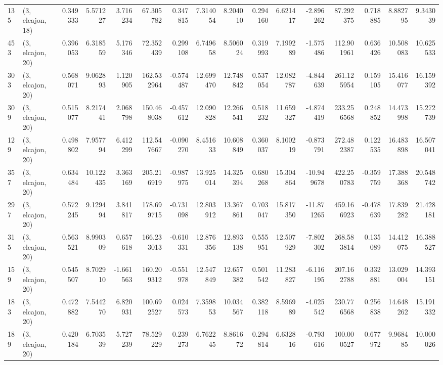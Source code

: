 \begin{tabular}{llrrrrrrrrrrrrrr}
135 &  (3, elcajon, 18) &   0.349333 &   5.571227 &   3.716234 &    67.305782 &   0.347815 &   7.314054 &   8.204010 &  0.294160 &   6.621417 &  -2.896262 &    87.292375 &   0.718885 &   8.882795 &   9.343039 \\
453 &  (3, elcajon, 20) &   0.396053 &   6.318559 &   5.176346 &    72.352439 &   0.299108 &   6.749658 &   8.506024 &  0.319993 &   7.199289 &  -1.575486 &   112.901961 &   0.636426 &  10.508083 &  10.625533 \\
303 &  (3, elcajon, 20) &   0.568071 &   9.062893 &   1.120905 &   162.532964 &  -0.574487 &  12.699470 &  12.748842 &  0.537054 &  12.082787 &  -4.844639 &   261.125954 &   0.159105 &  15.416077 &  16.159392 \\
309 &  (3, elcajon, 20) &   0.515077 &   8.217441 &   2.068798 &   150.468038 &  -0.457612 &  12.090828 &  12.266541 &  0.518232 &  11.659327 &  -4.874419 &   233.256568 &   0.248852 &  14.473998 &  15.272739 \\
129 &  (3, elcajon, 20) &   0.498802 &   7.957794 &   6.412299 &   112.547667 &  -0.090270 &   8.451633 &  10.608849 &  0.360037 &   8.100219 &  -0.873791 &   272.482387 &   0.122535 &  16.483898 &  16.507041 \\
357 &  (3, elcajon, 20) &   0.634484 &  10.122435 &   3.363169 &   205.216919 &  -0.987975 &  13.925014 &  14.325394 &  0.680268 &  15.304864 & -10.949678 &   422.250783 &  -0.359759 &  17.388368 &  20.548742 \\
297 &  (3, elcajon, 20) &   0.572245 &   9.129494 &   3.841817 &   178.699715 &  -0.731098 &  12.803912 &  13.367861 &  0.703047 &  15.817350 & -11.871265 &   459.166923 &  -0.478639 &  17.839282 &  21.428181 \\
315 &  (3, elcajon, 20) &   0.563521 &   8.990309 &   0.657618 &   166.233013 &  -0.610331 &  12.876356 &  12.893138 &  0.555951 &  12.507929 &  -7.802302 &   268.583814 &   0.135089 &  14.412075 &  16.388527 \\
159 &  (3, elcajon, 20) &   0.545507 &   8.702910 &  -1.661563 &   160.209312 &  -0.551978 &  12.547849 &  12.657382 &  0.501542 &  11.283827 &  -6.116195 &   207.162788 &   0.332881 &  13.029004 &  14.393151 \\
183 &  (3, elcajon, 20) &   0.472882 &   7.544270 &   6.820931 &   100.692527 &   0.024573 &   7.359853 &  10.034567 &  0.382118 &   8.596989 &  -4.025542 &   230.776568 &   0.256838 &  14.648262 &  15.191332 \\
189 &  (3, elcajon, 20) &   0.420184 &   6.703539 &   5.727239 &    78.529229 &   0.239273 &   6.762245 &   8.861672 &  0.294814 &   6.632816 &  -0.793616 &   100.000527 &   0.677972 &   9.968485 &  10.000026 \\

\end{tabular}
